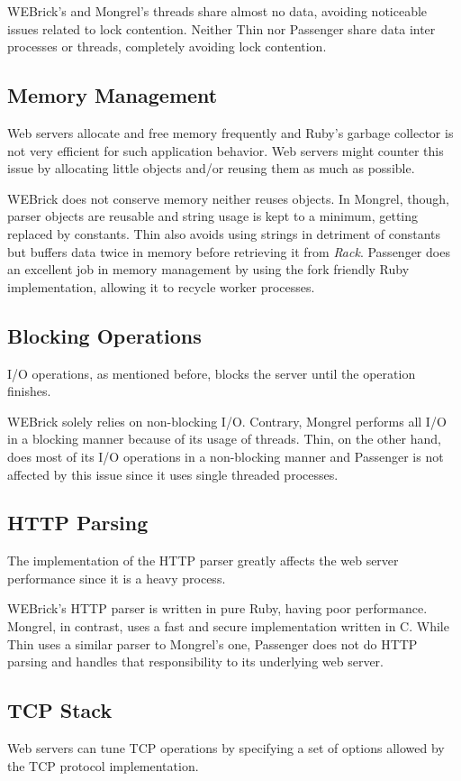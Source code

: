 WEBrick's and Mongrel's threads share almost no data, avoiding noticeable issues related to lock contention. Neither Thin nor Passenger share data inter processes or threads, completely avoiding lock contention.

\subsection{Memory Management}
Web servers allocate and free memory frequently and Ruby's garbage collector is not very efficient for such application behavior. Web servers might counter this issue by allocating little objects and/or reusing them as much as possible.

WEBrick does not conserve memory neither reuses objects. In Mongrel, though, parser objects are reusable and string usage is kept to a minimum, getting replaced by constants. Thin also avoids using strings in detriment of constants but buffers data twice in memory before retrieving it from \textit{Rack}. Passenger does an excellent job in memory management by using the fork friendly Ruby implementation, allowing it to recycle worker processes.

\subsection{Blocking Operations}
I/O operations, as mentioned before, blocks the server until the operation finishes.

WEBrick solely relies on non-blocking I/O. Contrary, Mongrel performs all I/O in a blocking manner because of its usage of threads. Thin, on the other hand, does most of its I/O operations in a non-blocking manner and Passenger is not affected by this issue since it uses single threaded processes.

\subsection{HTTP Parsing}
The implementation of the HTTP parser greatly affects the web server performance since it is a heavy process.

WEBrick's HTTP parser is written in pure Ruby, having poor performance. Mongrel, in contrast, uses a fast and secure implementation written in C. While Thin uses a similar parser to Mongrel's one, Passenger does not do HTTP parsing and handles that responsibility to its underlying web server.

\subsection{TCP Stack}
Web servers can tune TCP operations by specifying a set of options allowed by the TCP protocol implementation.

